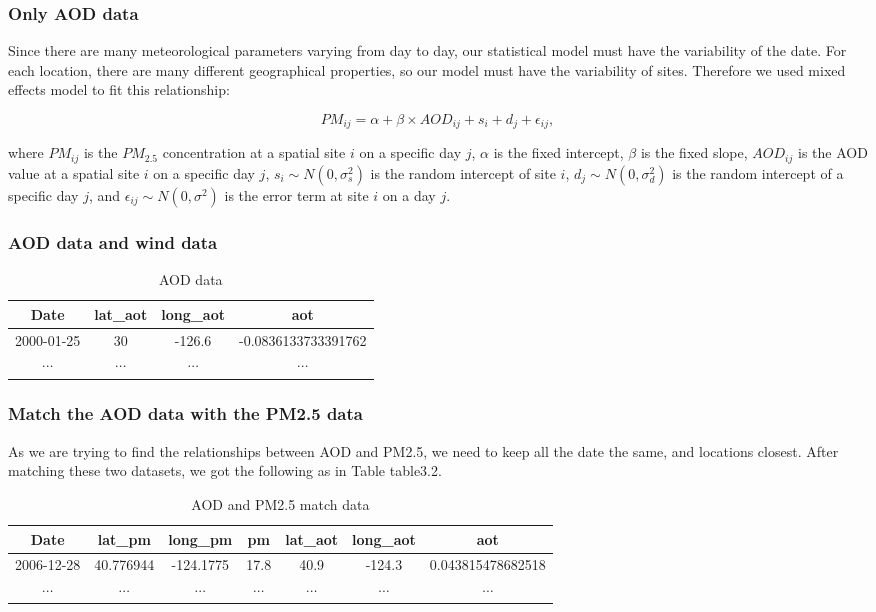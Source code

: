 \documentclass[10pt]{article}
\begin{document}
\subsubsection{Only AOD data}
Since there are many meteorological parameters varying from day to day, our statistical model must have the variability of the date. For each location, there are many different geographical properties, so our model must have the variability of sites. Therefore we used mixed effects model to fit this relationship:

$$PM_{ij} = \alpha + \beta\times AOD_{ij} + s_i + d_j+ \epsilon_{ij}, $$

where $PM_{ij}$ is the $PM_{2.5}$ concentration at a spatial site $i$ on a specific day $j$, $\alpha$ is the fixed intercept, $\beta$ is the fixed slope, $AOD_{ij}$ is the AOD value at a spatial site $i$ on a specific day $j$, $s_i\sim N(0, \sigma_s^2)$ is the random intercept of site $i$, $d_j\sim N(0, \sigma_d^2)$ is the random intercept of a specific day $j$, and $\epsilon_{ij}\sim N(0, \sigma^2)$ is the error term at site $i$ on a day $j$.

\subsubsection{AOD data and wind data}


\begin{table}[!h]
\centering
\begin{tabular}{|c|c|c|c|}
\hline 
Date & lat\_aot & long\_aot & aot\\
\hline
2000-01-25 & 30 & -126.6 & -0.0836133733391762 \\
\hline
$\cdots$ & $\cdots$ & $\cdots$ & $\cdots$\\
\hline
\end{tabular}
\caption{AOD data}
\label{table3.1}
\end{table}

\subsubsection{Match the AOD data with the PM2.5 data}
As we are trying to find the relationships between AOD and PM2.5, we need to keep all the date the same, and locations closest. After matching these two datasets, we got the following as in Table {table3.2}.

\begin{table}[!h]
\centering
\begin{tabular}{|c|c|c|c|c|c|c|}
\hline 
Date & lat\_pm & long\_pm & pm & lat\_aot & long\_aot & aot\\
\hline
2006-12-28 & 40.776944 & -124.1775 & 17.8 & 40.9 & -124.3 & 0.043815478682518\\
\hline
$\cdots$ & $\cdots$ & $\cdots$ & $\cdots$ & $\cdots$ & $\cdots$ & $\cdots$\\
\hline
\end{tabular}
\caption{AOD and PM2.5 match data}
\label{table3.2}
\end{table}
\end{document}
